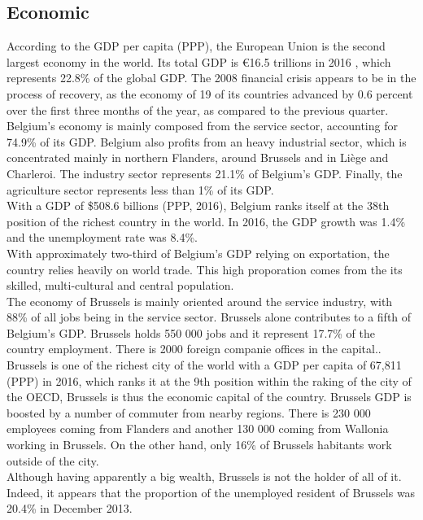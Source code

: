 \documentclass[12pt,a4paper,oneside]{book}
\begin{document}
\subsection{Economic}
According to the GDP per capita (PPP), the European Union is the second largest economy in the world. Its total GDP is \euro 16.5 trillions in 2016 , which represents 22.8\% of the global GDP\cite{imfgdp}. The 2008 financial crisis appears to be in the process of recovery, as the economy of 19 of its countries advanced by 0.6 percent over the first three months of the year, as compared to the previous quarter\cite{eurorecov}.\\

Belgium's economy is mainly composed from the service sector, accounting for 74.9\% of its GDP. Belgium also profits from an heavy industrial sector, which is concentrated mainly in northern Flanders, around Brussels and in Liège and Charleroi. The industry sector represents 21.1\% of Belgium's GDP. Finally, the agriculture sector represents less than 1\% of its GDP.\\
With a GDP of \$508.6 billions (PPP, 2016), Belgium ranks itself at the 38th position of the richest country in the world. In 2016, the GDP growth was 1.4\% and the unemployment rate was 8.4\%.\\
With approximately two-third of Belgium's GDP relying on exportation, the country relies heavily on world trade. This high proporation comes from the its skilled, multi-cultural and central population\cite{ciafb}.\\

The economy of Brussels is mainly oriented around the service industry, with 88\% of all jobs being in the service sector. Brussels alone contributes to a fifth of Belgium's GDP. Brussels holds 550 000 jobs and it represent 17.7\% of the country employment. There is 2000 foreign companie offices in the capital.\cite{bxinfo}.\\
Brussels is one of the richest city of the world with a GDP per capita of 67,811 (PPP) in 2016, which ranks it at the 9th position within the raking of the city of the OECD\cite{oecdstat}, Brussels is thus the economic capital of the country. Brussels GDP is boosted by a number of commuter from nearby regions. There is 230 000 employees coming from Flanders and another 130 000 coming from Wallonia working in Brussels. On the other hand, only 16\% of Brussels habitants work outside of the city\cite{euresCom}.\\
Although having apparently a big wealth, Brussels is not the holder of all of it. Indeed, it appears that the proportion of the unemployed resident of Brussels was 20.4\% in December 2013\cite{unemploybx}.
\end{document}

